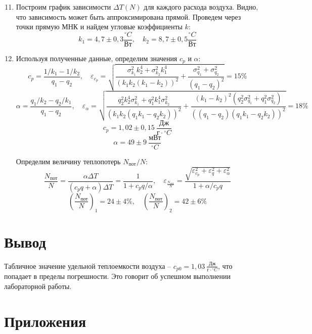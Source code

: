 \documentclass[14pt, a4paper]{report}
\begin{document}
\begin{enumerate}

\setcounter{enumi}{10}

\item Построим график зависимости $\Delta T(N)$ для каждого расхода воздуха. Видно, что зависимость может быть аппроксимирована прямой. Проведем через точки прямую МНК и найдем угловые коэффициенты $k$:
\[k_1=4,7\pm0,3 \frac{^\circ C}{Вт},\quad k_2=8,7\pm0,5 \frac{^\circ C}{Вт}\]

\item Используя полученные данные, определим значения $c_p$ и $\alpha$:
\[c_p=\frac{1/k_1-1/k_2}{q_1-q_2},\quad \varepsilon_{c_p}=\sqrt{\frac{\sigma_{k_1}^2k_2^4+\sigma_{k_2}^2k_1^4}{(k_1k_2(k_1-k_2))^2}+\frac{\sigma_{q_1}^2+\sigma_{q_2}^2}{(q_1-q_2)^2}}=15\%\]
\[\alpha=\frac{q_1/k_2-q_2/k_1}{q_1-q_2},\quad \varepsilon_{\alpha}=\sqrt{\frac{q_2^2k_2^4\sigma_{k_1}^2+q_1^2k_1^4\sigma_{k_2}^2}{(k_1k_2(q_1k_1-q_2k_2))^2}+\frac{(k_1-k_2)^2(q_2^2\sigma_{q_1}^2+q_1^2\sigma_{q_2}^2)}{((q_1-q_2)(q_1k_1-q_2k_2))^2}}=18\%\]
\[c_p=1,02\pm0,15\ \frac{Дж}{г\cdot{^\circ C}}\]
\[\alpha=49\pm9\ \frac{мВт}{^\circ C}\]

Определим величину теплопотерь $N_{пот}/N$:
\[\frac{N_{пот}}{N}=\frac{\alpha\Delta T}{(c_pq+\alpha)\Delta T}=\frac{1}{1+c_pq/\alpha},\quad\varepsilon_{\frac{N_{пот}}{N}}=\frac{\sqrt{\varepsilon_{c_p}^2+\varepsilon_q^2+\varepsilon_\alpha^2}}{1+\alpha/c_pq}\]
\[\left(\frac{N_{пот}}{N}\right)_1=24\pm4\%,\quad\left(\frac{N_{пот}}{N}\right)_2=42\pm6\%\]

\end{enumerate}

\section{Вывод}

Табличное значение удельной теплоемкости воздуха -- $c_{p0}=1,03\ \frac{Дж}{г\cdot{^\circ C}}$, что попадает в пределы погрешности. Это говорит об успешном выполнении лабораторной работы.

\section{Приложения}
\end{document}
